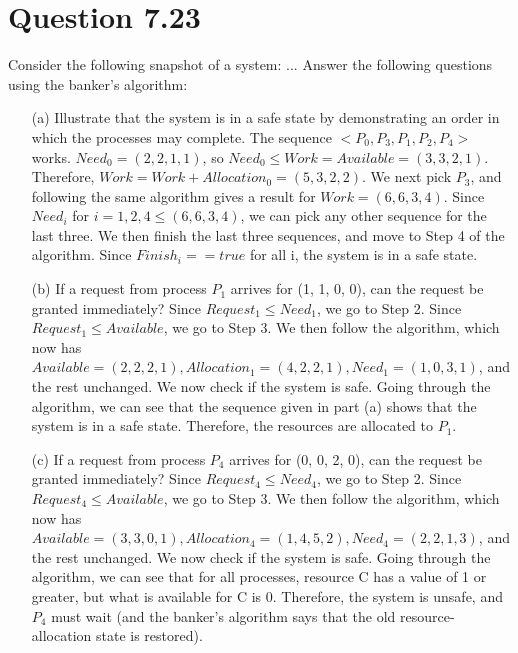 \documentclass[12pt]{article}
\begin{document}
\section*{Question 7.23} {\color{blue}Consider the following snapshot of a system: ... Answer the following questions using the banker's algorithm:
\begin{enumerate}
\item[(a)]Illustrate that the system is in a safe state by demonstrating an order in which the processes may complete. {\color{black}The sequence $<P_{0}, P_{3}, P_{1}, P_{2}, P_{4}>$ works. $Need_{0} = (2, 2, 1, 1)$, so $Need_{0} \le Work = Available = (3, 3, 2, 1)$. Therefore, $Work = Work + Allocation_{0} = (5, 3, 2, 2)$. We next pick $P_{3}$, and following the same algorithm gives a result for $Work = (6, 6, 3, 4)$. Since $Need_{i}$ for $i = 1, 2, 4 \le (6, 6, 3, 4)$, we can pick any other sequence for the last three. We then finish the last three sequences, and move to Step 4 of the algorithm. Since $Finish_{i} == true$ for all i, the system is in a safe state. 
}
\item[(b)]If a request from process $P_{1}$ arrives for (1, 1, 0, 0), can the request be granted immediately? {\color{black}Since $Request_{1} \le Need_{1}$, we go to Step 2. Since $Request_{1} \le Available$, we go to Step 3. We then follow the algorithm, which now has $Available = (2, 2, 2, 1), Allocation_{1} = (4, 2, 2, 1), Need_{1} = (1, 0, 3, 1)$, and the rest unchanged. We now check if the system is safe. Going through the algorithm, we can see that the sequence given in part (a) shows that the system is in a safe state. Therefore, the resources are allocated to $P_{1}$.
}
\item[(c)]If a request from process $P_{4}$ arrives for (0, 0, 2, 0), can the request be granted immediately? {\color{black}Since $Request_{4} \le Need_{4}$, we go to Step 2. Since $Request_{4} \le Available$, we go to Step 3. We then follow the algorithm, which now has $Available = (3, 3, 0, 1), Allocation_{4} = (1, 4, 5, 2), Need_{4} = (2, 2, 1, 3)$, and the rest unchanged. We now check if the system is safe. Going through the algorithm, we can see that for all processes, resource C has a value of 1 or greater, but what is available for C is 0. Therefore, the system is unsafe, and $P_{4}$ must wait (and the banker's algorithm says that the old resource-allocation state is restored).
}
\end{enumerate}

}
\end{document}

